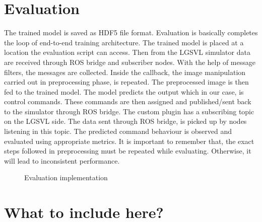 \section{Evaluation}
The trained model is saved as HDF5 file format. Evaluation is basically completes the loop
of end-to-end training architecture. The trained model is placed at a location the
evaluation script can access. Then from the LGSVL simulator data are received through ROS
bridge and subscriber nodes. With the help of message filters, the messages are collected.
Inside the callback, the image manipulation carried out in preprocessing phase, is
repeated. The preprocessed image is then fed to the trained model. The model predicts the
output which in our case, is control commands. These commands are then assigned and published/sent
back to the simulator through ROS bridge. The custom plugin has a subscribing topic on the
LGSVL side. The data sent through ROS bridge, is picked up by nodes listening in this topic. The predicted command behaviour is observed and
evaluated using appropriate metrics. It is important to remember that, the exact steps followed
in preprocessing must be repeated while evaluating. Otherwise, it will lead to inconsistent
performance.

\begin{figure}
	\centering
    \def\svgwidth{\textwidth}
    \caption{Evaluation implementation}
    \label{fig:evaluationfigure}
\end{figure}

\iffalse
\section{What to include here?}

